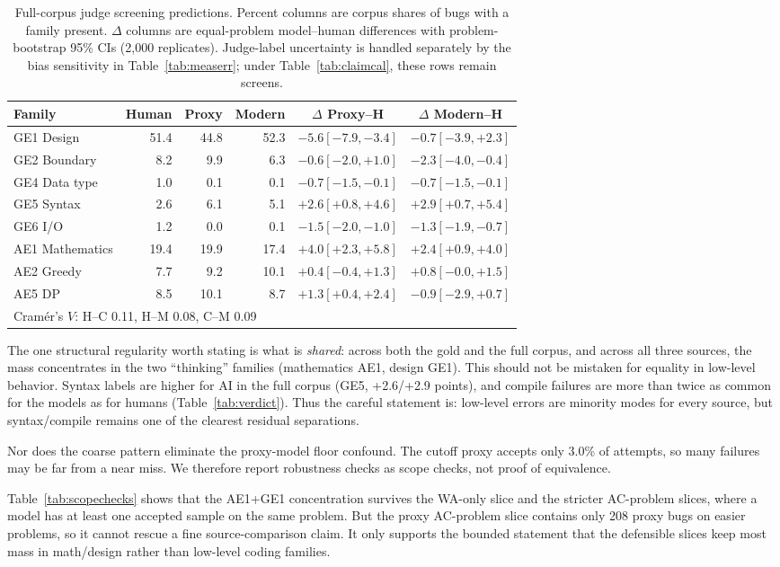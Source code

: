 \documentclass[conference]{IEEEtran}
\begin{document}
\begin{table}[t]
\centering
\caption{Full-corpus judge screening predictions. Percent columns are corpus shares of
bugs with a family present. $\Delta$ columns are equal-problem model--human differences with
problem-bootstrap 95\% CIs (2{,}000 replicates). Judge-label uncertainty is handled
separately by the bias sensitivity in Table~\ref{tab:measerr}; under
Table~\ref{tab:claimcal}, these rows remain screens.}
\label{tab:fullcorpus}
\scriptsize
\setlength{\tabcolsep}{3pt}
\begin{tabular}{lrrrcc}
\toprule
Family & Human & Proxy & Modern & $\Delta$ Proxy--H & $\Delta$ Modern--H\\
\midrule
GE1 Design & 51.4 & 44.8 & 52.3 & $-5.6[-7.9,-3.4]$ & $-0.7[-3.9,+2.3]$\\
GE2 Boundary & 8.2 & 9.9 & 6.3 & $-0.6[-2.0,+1.0]$ & $-2.3[-4.0,-0.4]$\\
GE4 Data type & 1.0 & 0.1 & 0.1 & $-0.7[-1.5,-0.1]$ & $-0.7[-1.5,-0.1]$\\
GE5 Syntax & 2.6 & 6.1 & 5.1 & $+2.6[+0.8,+4.6]$ & $+2.9[+0.7,+5.4]$\\
GE6 I/O & 1.2 & 0.0 & 0.1 & $-1.5[-2.0,-1.0]$ & $-1.3[-1.9,-0.7]$\\
AE1 Mathematics & 19.4 & 19.9 & 17.4 & $+4.0[+2.3,+5.8]$ & $+2.4[+0.9,+4.0]$\\
AE2 Greedy & 7.7 & 9.2 & 10.1 & $+0.4[-0.4,+1.3]$ & $+0.8[-0.0,+1.5]$\\
AE5 DP & 8.5 & 10.1 & 8.7 & $+1.3[+0.4,+2.4]$ & $-0.9[-2.9,+0.7]$\\
\midrule
\multicolumn{6}{l}{Cram\'er's $V$: H--C 0.11, H--M 0.08, C--M 0.09}\\
\bottomrule
\end{tabular}
\end{table}

The one structural regularity worth stating is what is \emph{shared}: across both
the gold and the full corpus, and across all three sources, the mass concentrates in
the two ``thinking'' families (mathematics AE1, design GE1). This should not be
mistaken for equality in low-level behavior. Syntax labels are higher for AI in the
full corpus (GE5, +2.6/+2.9 points), and compile failures are more than twice as
common for the models as for humans (Table~\ref{tab:verdict}). Thus the careful
statement is: low-level errors are minority modes for every source, but syntax/compile
remains one of the clearest residual separations.

Nor does the coarse pattern eliminate the proxy-model floor confound. The cutoff proxy
accepts only 3.0\% of attempts, so many failures may be far from a near miss. We
therefore report robustness checks as scope checks, not proof of equivalence.

Table~\ref{tab:scopechecks} shows that the AE1+GE1 concentration survives the
WA-only slice and the stricter AC-problem slices, where a model has at least one
accepted sample on the same problem. But the proxy AC-problem slice contains only 208
proxy bugs on easier problems, so it cannot rescue a fine source-comparison claim.
It only supports the bounded statement that the defensible slices keep most mass in
math/design rather than low-level coding families.
\end{document}
